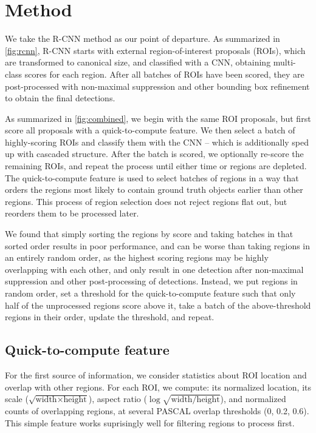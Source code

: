 \section{Method}\label{sec:ccnn_method}

We take the R-CNN \cite{Girshick-CVPR-2014} method as our point of departure.
As summarized in \autoref{fig:rcnn}, R-CNN starts with external region-of-interest proposals (ROIs), which are transformed to canonical size, and classified with a CNN, obtaining multi-class scores for each region.
After all batches of ROIs have been scored, they are post-processed with non-maximal suppression and other bounding box refinement to obtain the final detections.

As summarized in \autoref{fig:combined}, we begin with the same ROI proposals, but first score all proposals with a quick-to-compute feature.
We then select a batch of highly-scoring ROIs and classify them with the CNN -- which is additionally sped up with cascaded structure.
After the batch is scored, we optionally re-score the remaining ROIs, and repeat the process until either time or regions are depleted.
The quick-to-compute feature is used to select batches of regions in a way that orders the regions most likely to contain ground truth objects earlier than other regions.
This process of region selection does not reject regions flat out, but reorders them to be processed later.

We found that simply sorting the regions by score and taking batches in that sorted order results in poor performance, and can be worse than taking regions in an entirely random order, as the highest scoring regions may be highly overlapping with each other, and only result in one detection after non-maximal suppression and other post-processing of detections.
Instead, we put regions in random order, set a threshold for the quick-to-compute feature such that only half of the unprocessed regions score above it, take a batch of the above-threshold regions in their order, update the threshold, and repeat.





\subsection{Quick-to-compute feature}

For the first source of information, we consider statistics about ROI location and overlap with other regions.
For each ROI, we compute: its normalized location, its scale ($\sqrt{\text{width} \times \text{height}}$), aspect ratio ($\log \sqrt{\text{width} / \text{height}}$), and normalized counts of overlapping regions, at several PASCAL overlap thresholds (0, 0.2, 0.6).
This simple feature works suprisingly well for filtering regions to process first.

